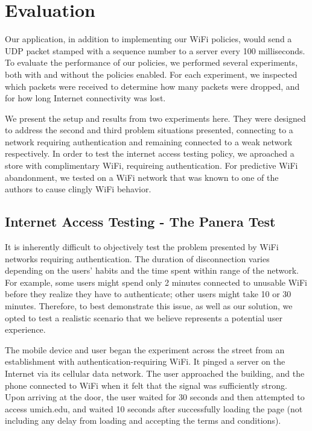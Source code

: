 \section{Evaluation}
\label{sec:eval}

Our application, in addition to implementing our WiFi policies, would send a UDP packet stamped with a sequence number to a server every 100 milliseconds. To evaluate the performance of our policies, we performed several experiments, both with and without the policies enabled. For each experiment, we inspected which packets were received to determine how many packets were dropped, and for how long Internet connectivity was lost.

We present the setup and results from two experiments here. They were designed to address the second and third problem situations presented, connecting to a network requiring authentication and remaining connected to a weak network respectively. In order to test the internet access testing policy, we aproached a store with complimentary WiFi, requireing authentication. For predictive WiFi abandonment, we tested on a WiFi network that was known to one of the authors to cause clingly WiFi behavior.

\subsection{Internet Access Testing - The Panera Test}
It is inherently difficult to objectively test the problem presented by WiFi networks requiring authentication. The duration of disconnection varies depending on the users' habits and the time spent within range of the network. For example, some users might spend only 2 minutes connected to unusable WiFi before they realize they have to authenticate; other users might take 10 or 30 minutes. Therefore, to best demonstrate this issue, as well as our solution, we opted to test a realistic scenario that we believe represents a potential user experience.

The mobile device and user began the experiment across the street from an establishment with authentication-requiring WiFi. It pinged a server on the Internet via its cellular data network. The user approached the building, and the phone connected to WiFi when it felt that the signal was sufficiently strong. Upon arriving at the door, the user waited for 30 seconds and then attempted to access umich.edu, and waited 10 seconds after successfully loading the page (not including any delay from loading and accepting the terms and conditions).

